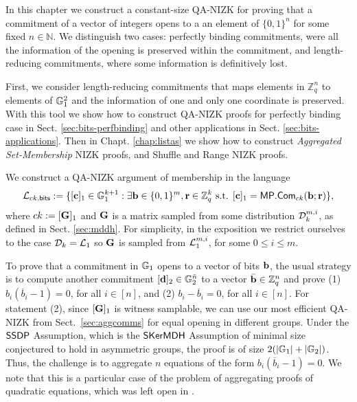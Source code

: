 \label{sec:instantiations}
In this chapter we construct a constant-size QA-NIZK for proving that a commitment of a vector of integers opens to a 
an element of $\{0,1\}^n$ for some fixed $n\in\mathbb{N}$. We distinguish two cases: perfectly binding commitments, were all the information of the opening is preserved within the commitment, and length-reducing commitments, where some information is definitively lost.

First, we consider length-reducing commitments that maps elements in $\mathbb{Z}_q^n$ to elements of $\mathbb{G}_1^2$ and the information of one and only one coordinate is preserved. With this tool we show how to construct QA-NIZK proofs for perfectly binding case in Sect. \ref{sec:bits-perfbinding} and other applications in Sect. \ref{sec:bits-applications}. Then in Chapt. \ref{chap:listas} we show how to construct \emph{Aggregated Set-Membership} NIZK proofs, and Shuffle and Range NIZK proofs.

We construct a QA-NIZK argument of membership in the language
$$
\mathcal{L}_{ck,\mathsf{bits}} := \{[\mathbf{c}]_1\in\mathbb{G}_1^{k+1} : \exists \mathbf{b}\in\{0,1\}^m,\mathbf{r}\in\mathbb{Z}_q^k \text{ s.t. } [\mathbf{c}]_1 = \mathsf{MP}.\mathsf{Com}_{ck}(\mathbf{b};\mathbf{r})\},
$$
where $ck:=[\mathbf{{G}}]_1$ and $\mathbf{{G}}$ is a matrix sampled from 
some distribution $\mathcal{D}_k^{m,i}$, as defined in Sect. \ref{sec:mddh}. For simplicity, in the exposition we restrict ourselves to the case $\mathcal{D}_k=\mathcal{L}_{1}$ so  $\mathbf{{G}}$ is sampled from $\mathcal{L}_1^{m,i}$, for some $0 \leq i \leq m$.

To prove that a commitment in $\mathbb{G}_1$ opens to a vector of bits $\mathbf{b}$, the usual strategy is to compute another commitment $[\mathbf{d}]_2\in\mathbb{G}_2^{\bar{n}}$ to a vector $\bar{\mathbf{b}}\in\mathbb{Z}_q^n$ and prove 
  (1) $b_i(\overline{b}_i-1)=0$, for all $i \in [n]$, and 
  (2) $b_i-\overline{b}_i=0$, for all $i \in [n]$. 
For statement  (2), since $[\mathbf{{G}}]_1$ is witness samplable, we can use our most efficient QA-NIZK from Sect.\ \ref{sec:aggcomms} for equal opening in different groups.  Under the $\mathsf{SSDP}$ Assumption, which is the $\mathsf{SKerMDH}$ Assumption of minimal size conjectured to hold in asymmetric groups, the proof is of size $2(|\mathbb{G}_1|+|\mathbb{G}_2|)$. Thus, the challenge is to aggregate $n$ equations of the form $b_i(\overline{b}_i-1)=0$. We note that this is a particular case of the problem of aggregating proofs of quadratic equations, which was left open in \cite{C:JutRoy14}.




